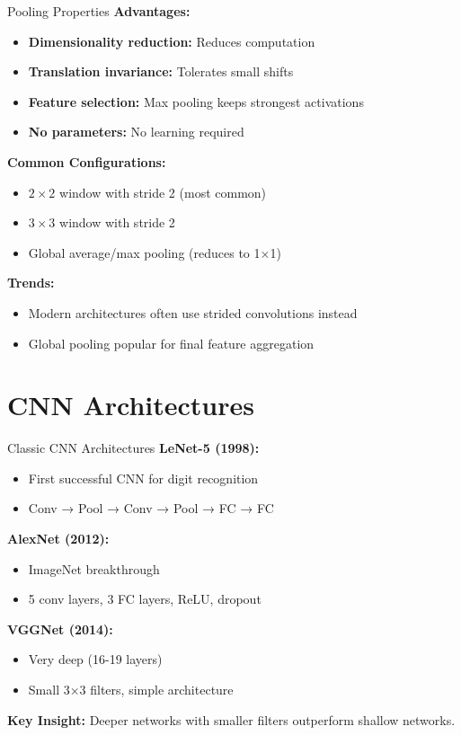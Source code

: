 \documentclass[aspectratio=169,10pt]{beamer}
\begin{document}
\begin{frame}{Pooling Properties}
\textbf{Advantages:}
\begin{itemize}
\item \textbf{Dimensionality reduction:} Reduces computation
\item \textbf{Translation invariance:} Tolerates small shifts
\item \textbf{Feature selection:} Max pooling keeps strongest activations
\item \textbf{No parameters:} No learning required
\end{itemize}

\textbf{Common Configurations:}
\begin{itemize}
\item $2 \times 2$ window with stride 2 (most common)
\item $3 \times 3$ window with stride 2
\item Global average/max pooling (reduces to 1×1)
\end{itemize}

\textbf{Trends:}
\begin{itemize}
\item Modern architectures often use strided convolutions instead
\item Global pooling popular for final feature aggregation
\end{itemize}
\end{frame}

\section{CNN Architectures}

\begin{frame}{Classic CNN Architectures}
\textbf{LeNet-5 (1998):}
\begin{itemize}
\item First successful CNN for digit recognition
\item Conv → Pool → Conv → Pool → FC → FC
\end{itemize}

\textbf{AlexNet (2012):}
\begin{itemize}
\item ImageNet breakthrough
\item 5 conv layers, 3 FC layers, ReLU, dropout
\end{itemize}

\textbf{VGGNet (2014):}
\begin{itemize}
\item Very deep (16-19 layers)
\item Small 3×3 filters, simple architecture
\end{itemize}

\textbf{Key Insight:} Deeper networks with smaller filters outperform shallow networks.
\end{frame}
\end{document}
